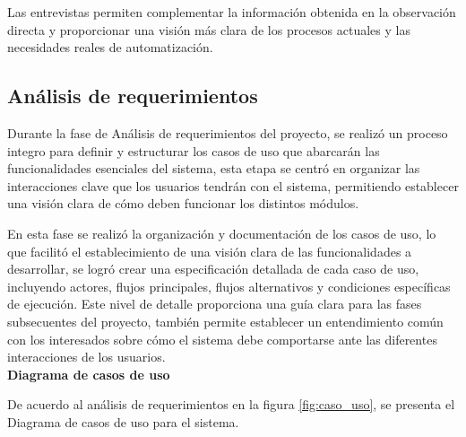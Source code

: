 	Las entrevistas permiten complementar la información obtenida en la observación directa y proporcionar una visión más clara de los procesos actuales y las necesidades reales de automatización.	
	
	\subsection{Análisis de requerimientos}
	Durante la fase de Análisis de requerimientos del proyecto, se realizó un proceso integro para definir y estructurar los casos de uso que abarcarán las funcionalidades esenciales del sistema, esta etapa se centró en organizar las interacciones clave que los usuarios tendrán con el sistema, permitiendo establecer una visión clara de cómo deben funcionar los distintos módulos.
	
	En esta fase se realizó la organización y documentación de los casos de uso, lo que facilitó el establecimiento de una visión clara de las funcionalidades a desarrollar, se logró crear una especificación detallada de cada caso de uso, incluyendo actores, flujos principales, flujos alternativos y condiciones específicas de ejecución. Este nivel de detalle proporciona una guía clara para las fases subsecuentes del proyecto, también permite establecer un entendimiento común con los interesados sobre cómo el sistema debe comportarse ante las diferentes interacciones de los usuarios.\\
	\textbf{Diagrama de casos de uso}
		
	De acuerdo al análisis de requerimientos en la figura \ref{fig:caso_uso}, se presenta el Diagrama de casos de uso para el sistema.
	
